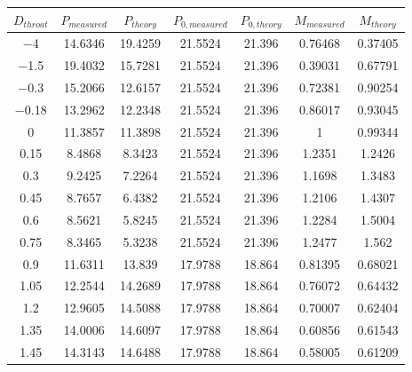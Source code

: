 \begin{tabular}{ccccccc}
\toprule
$D_{throat}$ & $P_{measured}$ & $P_{theory}$ & $P_{0,measured}$ & $P_{0,theory}$ & $M_{measured}$ & $M_{theory}$ \\
\midrule
\num{-4} & \num{14.6346} & \num{19.4259} & \num{21.5524} & \num{21.396} & \num{0.76468} & \num{0.37405} \\ 
\num{-1.5} & \num{19.4032} & \num{15.7281} & \num{21.5524} & \num{21.396} & \num{0.39031} & \num{0.67791} \\ 
\num{-0.3} & \num{15.2066} & \num{12.6157} & \num{21.5524} & \num{21.396} & \num{0.72381} & \num{0.90254} \\ 
\num{-0.18} & \num{13.2962} & \num{12.2348} & \num{21.5524} & \num{21.396} & \num{0.86017} & \num{0.93045} \\ 
\num{0} & \num{11.3857} & \num{11.3898} & \num{21.5524} & \num{21.396} & \num{1} & \num{0.99344} \\ 
\num{0.15} & \num{8.4868} & \num{8.3423} & \num{21.5524} & \num{21.396} & \num{1.2351} & \num{1.2426} \\ 
\num{0.3} & \num{9.2425} & \num{7.2264} & \num{21.5524} & \num{21.396} & \num{1.1698} & \num{1.3483} \\ 
\num{0.45} & \num{8.7657} & \num{6.4382} & \num{21.5524} & \num{21.396} & \num{1.2106} & \num{1.4307} \\ 
\num{0.6} & \num{8.5621} & \num{5.8245} & \num{21.5524} & \num{21.396} & \num{1.2284} & \num{1.5004} \\ 
\num{0.75} & \num{8.3465} & \num{5.3238} & \num{21.5524} & \num{21.396} & \num{1.2477} & \num{1.562} \\ 
\num{0.9} & \num{11.6311} & \num{13.839} & \num{17.9788} & \num{18.864} & \num{0.81395} & \num{0.68021} \\ 
\num{1.05} & \num{12.2544} & \num{14.2689} & \num{17.9788} & \num{18.864} & \num{0.76072} & \num{0.64432} \\ 
\num{1.2} & \num{12.9605} & \num{14.5088} & \num{17.9788} & \num{18.864} & \num{0.70007} & \num{0.62404} \\ 
\num{1.35} & \num{14.0006} & \num{14.6097} & \num{17.9788} & \num{18.864} & \num{0.60856} & \num{0.61543} \\ 
\num{1.45} & \num{14.3143} & \num{14.6488} & \num{17.9788} & \num{18.864} & \num{0.58005} & \num{0.61209} \\ 
\bottomrule
\end{tabular}